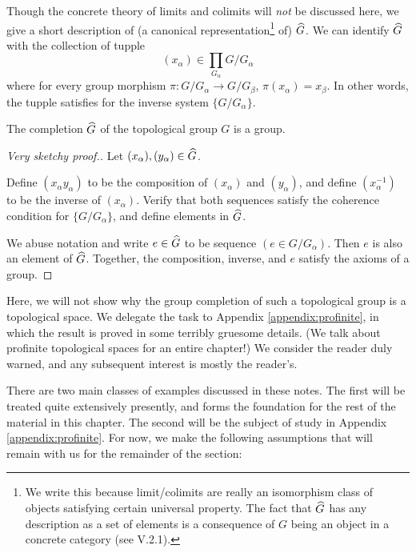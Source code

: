 Though the concrete theory of limits and colimits will \emph{not} 
be discussed here, we give a short description of (a canonical
representation\footnote{We write this because limit/colimits are
really an isomorphism class of objects satisfying certain universal
property. The fact that $\widehat{G}$ has any description as a set
of elements is a consequence of $G$ being an object in a concrete 
category (see \cite{ML} V.2.1).} of) $\widehat{G}$. We can 
identify $\widehat{G}$ with the collection of tupple 
\[
(x_\alpha) \in \prod_{G_\alpha} G/G_{\alpha}
\]
where for every group morphism $\pi : G/G_\alpha \to G/G_\beta$, 
$\pi(x_{\alpha}) = x_\beta$. In other words, the tupple satisfies
for the inverse system $\{G/G_\alpha\}$.

\begin{prop}
The completion $\widehat{G}$ of the topological group $G$ is a 
group.
\end{prop}
\begin{proof}[Very sketchy proof.]
Let $(x_\alpha), (y_\alpha) \in \widehat{G}$.

Define $(x_\alpha y_\alpha)$ to be the composition of $(x_\alpha)$ 
and $(y_\alpha)$, and define $(x_\alpha^{-1})$ to be the inverse
of $(x_\alpha)$. Verify that both sequences satisfy the coherence
condition for $\{G/G_\alpha\}$, and define elements in 
$\widehat{G}$.

We abuse notation and write $e \in \widehat{G}$ to be sequence 
$(e \in G/G_\alpha)$. Then $e$ is also an element of $\widehat{G}$.
Together, the composition, inverse, and $e$ satisfy the axioms of
a group.
\end{proof}

\begin{rmk}
Here, we will not show why the group completion of such a 
topological group is a topological space. We delegate the task to 
Appendix \ref{appendix:profinite}, in which the result is proved 
in some terribly gruesome details. (We talk about profinite 
topological spaces for an entire chapter!) We consider the reader 
duly warned, and any subsequent interest is mostly the reader's.
\end{rmk}

There are two main classes of examples discussed in these notes.
The first will be treated quite extensively presently, and forms 
the foundation for the rest of the material in this chapter. The 
second will be the subject of study in Appendix 
\ref{appendix:profinite}. For now, we make the following 
assumptions that will remain with us for the remainder of the 
section:

